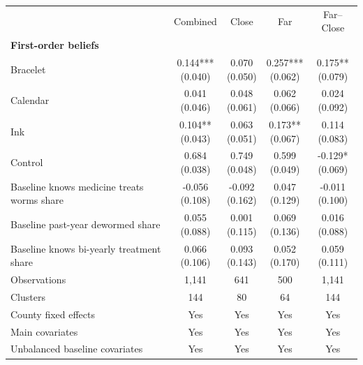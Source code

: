 \begin{tabular}{lcccc}
\toprule
 & Combined & Close & Far & Far--Close \\
\multicolumn{5}{l}{\textbf{First-order beliefs}} \\
\addlinespace[0.2em]
Bracelet & \makecell[c]{0.144***\\{(0.040)}} & \makecell[c]{0.070\\{(0.050)}} & \makecell[c]{0.257***\\{(0.062)}} & \makecell[c]{0.175**\\{(0.079)}} \\
Calendar & \makecell[c]{0.041\\{(0.046)}} & \makecell[c]{0.048\\{(0.061)}} & \makecell[c]{0.062\\{(0.066)}} & \makecell[c]{0.024\\{(0.092)}} \\
Ink & \makecell[c]{0.104**\\{(0.043)}} & \makecell[c]{0.063\\{(0.051)}} & \makecell[c]{0.173**\\{(0.067)}} & \makecell[c]{0.114\\{(0.083)}} \\
Control & \makecell[c]{0.684\\{(0.038)}} & \makecell[c]{0.749\\{(0.048)}} & \makecell[c]{0.599\\{(0.049)}} & \makecell[c]{-0.129*\\{(0.069)}} \\
\addlinespace[0.3em]
Baseline knows medicine treats worms share & \makecell[c]{-0.056\\{(0.108)}} & \makecell[c]{-0.092\\{(0.162)}} & \makecell[c]{0.047\\{(0.129)}} & \makecell[c]{-0.011\\{(0.100)}} \\
Baseline past-year dewormed share & \makecell[c]{0.055\\{(0.088)}} & \makecell[c]{0.001\\{(0.115)}} & \makecell[c]{0.069\\{(0.136)}} & \makecell[c]{0.016\\{(0.088)}} \\
Baseline knows bi-yearly treatment share & \makecell[c]{0.066\\{(0.106)}} & \makecell[c]{0.093\\{(0.143)}} & \makecell[c]{0.052\\{(0.170)}} & \makecell[c]{0.059\\{(0.111)}} \\
\addlinespace[0.3em]
Observations & 1,141 & 641 & 500 & 1,141 \\
Clusters & 144 & 80 & 64 & 144 \\
County fixed effects & Yes & Yes & Yes & Yes \\
Main covariates & Yes & Yes & Yes & Yes \\
Unbalanced baseline covariates & Yes & Yes & Yes & Yes \\
\bottomrule
\end{tabular}
